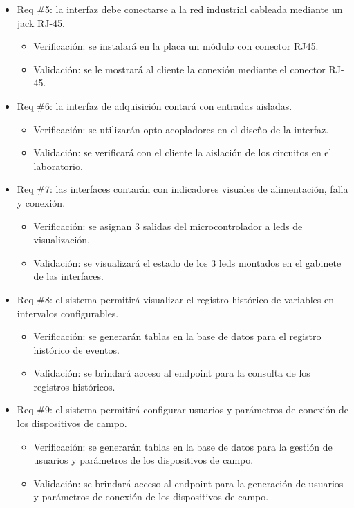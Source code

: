 \documentclass[
11pt%
]{charter}
\begin{document}
\begin{itemize}
\item Req \#5: la interfaz debe conectarse a la red industrial cableada mediante un jack RJ-45.

\begin{itemize}
	\item Verificación: se instalará en la placa un módulo con conector RJ45.  
	\item Validación: se le mostrará al cliente la conexión mediante el conector RJ-45.
\end{itemize}

\item Req \#6: la interfaz de adquisición contará con entradas aisladas.

\begin{itemize}
	\item Verificación: se utilizarán opto acopladores en el diseño de la interfaz.  
	\item Validación: se verificará con el cliente la aislación de los circuitos en el laboratorio.
\end{itemize}

\item Req \#7: las interfaces contarán con indicadores visuales de alimentación, falla y conexión.

\begin{itemize}
	\item Verificación: se asignan 3 salidas del microcontrolador a leds de visualización.  
	\item Validación: se visualizará el estado de los 3 leds montados en el gabinete de las interfaces.
\end{itemize}

\item Req \#8: el sistema permitirá visualizar el registro histórico de variables en intervalos configurables.

\begin{itemize}
	\item Verificación: se generarán tablas en la base de datos para el registro histórico de eventos.  
	\item Validación: se brindará acceso al endpoint para la consulta de los registros históricos.
\end{itemize}

\item Req \#9: el sistema permitirá configurar usuarios y parámetros de conexión de los dispositivos de campo.

\begin{itemize}
	\item Verificación: se generarán tablas en la base de datos para la gestión de usuarios y parámetros de los dispositivos de campo.  
	\item Validación: se brindará acceso al endpoint para la generación de usuarios y parámetros de conexión de los dispositivos de campo.
\end{itemize}


\end{itemize}
\end{document}
